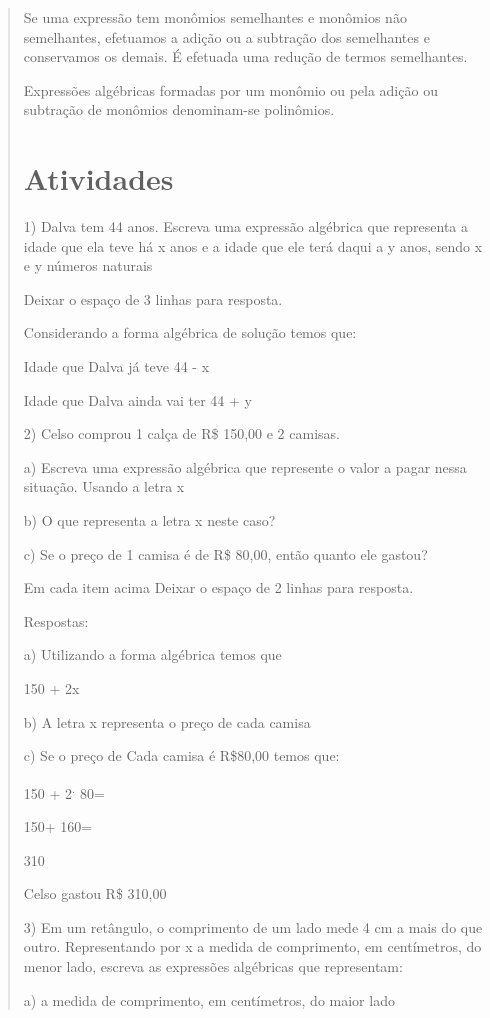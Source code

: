\begin{quote}
\begin{escolha}
{Se uma expressão tem monômios semelhantes e monômios não semelhantes,
efetuamos a adição ou a subtração dos semelhantes e conservamos os
demais. É efetuada uma redução de termos semelhantes.

Expressões algébricas formadas por um monômio ou pela adição ou
subtração de monômios denominam-se polinômios.}

\section{Atividades}

1) Dalva tem 44 anos. Escreva uma expressão algébrica que representa a
idade que ela teve há x anos e a idade que ele terá daqui a y anos,
sendo x e y números naturais

Deixar o espaço de 3 linhas para resposta.

Considerando a forma algébrica de solução temos que:

Idade que Dalva já teve 44 - x

Idade que Dalva ainda vai ter 44 + y

2) Celso comprou 1 calça de R\$ 150,00 e 2 camisas.

a) Escreva uma expressão algébrica que represente o valor a pagar nessa
situação. Usando a letra x

b) O que representa a letra x neste caso?

c) Se o preço de 1 camisa é de R\$ 80,00, então quanto ele gastou?

Em cada item acima Deixar o espaço de 2 linhas para resposta.

Respostas:

a) Utilizando a forma algébrica temos que

150 + 2x

b) A letra x representa o preço de cada camisa

c) Se o preço de Cada camisa é R\$80,00 temos que:

150 + 2\textsuperscript{.} 80=

150+ 160=

310

Celso gastou R\$ 310,00

3) Em um retângulo, o comprimento de um lado mede 4 cm a mais do que
outro. Representando por x a medida de comprimento, em centímetros, do
menor lado, escreva as expressões algébricas que representam:

a) a medida de comprimento, em centímetros, do maior lado


\end{escolha}
\end{quote}
